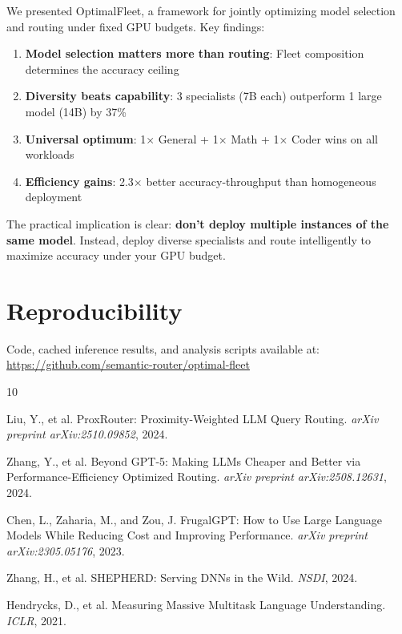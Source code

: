 \documentclass[11pt,a4paper]{article}
\newcommand{\method}{OptimalFleet}
\begin{document}
We presented \method{}, a framework for jointly optimizing model selection and routing under fixed GPU budgets. Key findings:

\begin{enumerate}
    \item \textbf{Model selection matters more than routing}: Fleet composition determines the accuracy ceiling
    \item \textbf{Diversity beats capability}: 3 specialists (7B each) outperform 1 large model (14B) by 37\%
    \item \textbf{Universal optimum}: 1$\times$ General + 1$\times$ Math + 1$\times$ Coder wins on all workloads
    \item \textbf{Efficiency gains}: 2.3$\times$ better accuracy-throughput than homogeneous deployment
\end{enumerate}

The practical implication is clear: \textbf{don't deploy multiple instances of the same model}. Instead, deploy diverse specialists and route intelligently to maximize accuracy under your GPU budget.

\section*{Reproducibility}

Code, cached inference results, and analysis scripts available at: \url{https://github.com/semantic-router/optimal-fleet}


\begin{thebibliography}{10}

Liu, Y., et al.
\newblock ProxRouter: Proximity-Weighted LLM Query Routing.
\newblock \emph{arXiv preprint arXiv:2510.09852}, 2024.

Zhang, Y., et al.
\newblock Beyond GPT-5: Making LLMs Cheaper and Better via Performance-Efficiency Optimized Routing.
\newblock \emph{arXiv preprint arXiv:2508.12631}, 2024.

Chen, L., Zaharia, M., and Zou, J.
\newblock FrugalGPT: How to Use Large Language Models While Reducing Cost and Improving Performance.
\newblock \emph{arXiv preprint arXiv:2305.05176}, 2023.

Zhang, H., et al.
\newblock SHEPHERD: Serving DNNs in the Wild.
\newblock \emph{NSDI}, 2024.

Hendrycks, D., et al.
\newblock Measuring Massive Multitask Language Understanding.
\newblock \emph{ICLR}, 2021.

\end{thebibliography}
\end{document}
